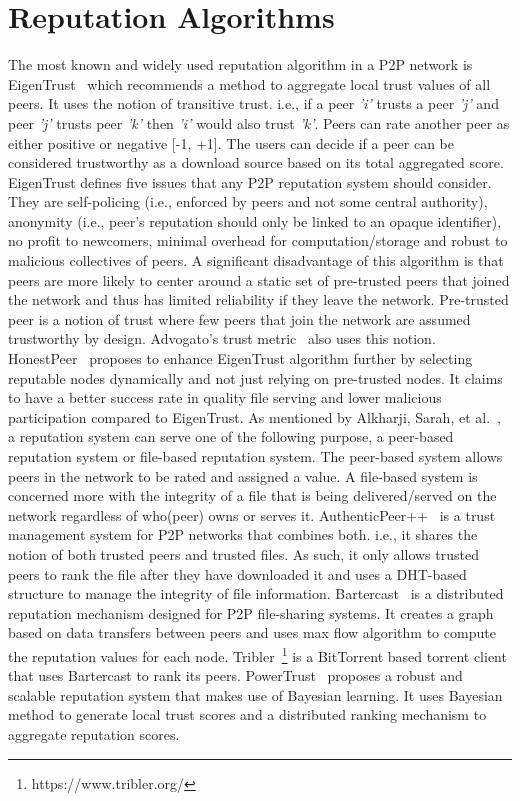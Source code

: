 \section{Reputation Algorithms}
The most known and widely used reputation algorithm in a P2P network is
EigenTrust~\cite{kamvar2003eigentrust} which recommends a method to aggregate
local trust values of all peers. It uses the notion of transitive trust. i.e.,
if a peer \textit{'i'} trusts a peer \textit{'j'} and peer \textit{'j'} trusts
peer \textit{'k'} then \textit{'i'} would also trust \textit{'k'}. Peers can
rate another peer as either positive or negative [-1, +1]. The users can decide
if a peer can be considered trustworthy as a download source based on its total
aggregated score. EigenTrust defines five issues that any P2P reputation system
should consider. They are self-policing (i.e., enforced by peers and not some
central authority), anonymity (i.e., peer's reputation should only be linked to
an opaque identifier), no profit to newcomers, minimal overhead for
computation/storage and robust to malicious collectives of peers. A significant
disadvantage of this algorithm is that peers are more likely to center around a
static set of pre-trusted peers that joined the network and thus has limited
reliability if they leave the network.  Pre-trusted peer is a notion of trust
where few peers that join the network are assumed trustworthy by design.
Advogato's trust metric~\cite{levien2003advogato} also uses this notion.
HonestPeer~\cite{kurdi2015honestpeer} proposes to enhance EigenTrust algorithm
further by selecting reputable nodes dynamically and not just relying on
pre-trusted nodes. It claims to have a better success rate in quality file
serving and lower malicious participation compared to EigenTrust.  As mentioned
by Alkharji, Sarah, et al.~\cite{alkharji2017authenticpeer++}, a reputation
system can serve one of the following purpose, a peer-based reputation system
or file-based reputation system. The peer-based system allows peers in the
network to be rated and assigned a value. A file-based system is concerned more
with the integrity of a file that is being delivered/served on the network
regardless of who(peer) owns or serves it.
AuthenticPeer++~\cite{alkharji2017authenticpeer++} is a trust management system
for P2P networks that combines both. i.e., it shares the notion of both trusted
peers and trusted files. As such, it only allows trusted peers to rank the file
after they have downloaded it and uses a DHT-based structure to manage the
integrity of file information.  Bartercast~\cite{meulpolder2009bartercast} is a
distributed reputation mechanism designed for P2P file-sharing systems. It
creates a graph based on data transfers between peers and uses max flow
algorithm to compute the reputation values for each node.
Tribler~\footnote{https://www.tribler.org/} is a BitTorrent based torrent
client that uses Bartercast to rank its peers.
PowerTrust~\cite{zhou2007powertrust} proposes a robust and scalable reputation
system that makes use of Bayesian learning. It uses Bayesian method to generate
local trust scores and a distributed ranking mechanism to aggregate reputation
scores. 

